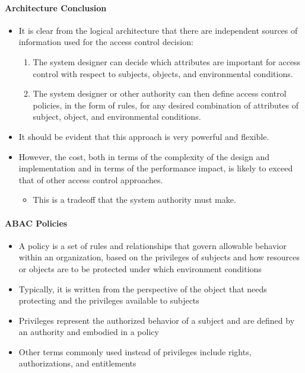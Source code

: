 \paragraph{Architecture Conclusion}
\begin{itemize}
    \item It is clear from the logical architecture that there are independent sources of information used for the access control decision:
    \begin{enumerate}
        \item The system designer can decide which attributes are important for access control with respect to subjects, objects, and environmental conditions.
        \item The system designer or other authority can then define access control policies, in the form of rules, for any desired combination of attributes of subject, object, and environmental conditions.
    \end{enumerate}
    \item It should be evident that this approach is very powerful and flexible.
    \item However, the cost, both in terms of the complexity of the design and implementation and in terms of the performance impact, is likely to exceed that of other access control approaches.
    \begin{itemize}
        \item This is a tradeoff that the system authority must make.
    \end{itemize}
\end{itemize}

\paragraph{ABAC Policies}
\begin{itemize}
    \item A policy is a set of rules and relationships that govern allowable behavior within an organization, based on the privileges of subjects and how resources or objects are to be protected under which environment conditions
    \item Typically, it is written from the perspective of the object that needs protecting and the privileges available to subjects
    \item Privileges represent the authorized behavior of a subject and are defined by an authority and embodied in a policy
    \item Other terms commonly used instead of privileges include rights, authorizations, and entitlements
\end{itemize}

